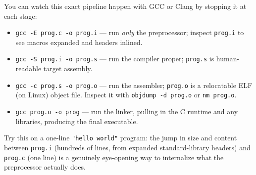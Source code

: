 \documentclass[11pt]{article}
\begin{document}
\begin{enrichment}
You can watch this exact pipeline happen with GCC or Clang by stopping it at each stage:
\begin{itemize}
  \item \texttt{gcc -E prog.c -o prog.i} --- run \emph{only} the preprocessor; inspect
  \texttt{prog.i} to see macros expanded and headers inlined.
  \item \texttt{gcc -S prog.i -o prog.s} --- run the compiler proper; \texttt{prog.s} is
  human-readable target assembly.
  \item \texttt{gcc -c prog.s -o prog.o} --- run the assembler; \texttt{prog.o} is a relocatable
  ELF (on Linux) object file. Inspect it with \texttt{objdump -d prog.o} or \texttt{nm prog.o}.
  \item \texttt{gcc prog.o -o prog} --- run the linker, pulling in the C runtime and any
  libraries, producing the final executable.
\end{itemize}
Try this on a one-line \texttt{"hello world"} program: the jump in size and content between
\texttt{prog.i} (hundreds of lines, from expanded standard-library headers) and \texttt{prog.c}
(one line) is a genuinely eye-opening way to internalize what the preprocessor actually does.
\end{enrichment}
\end{document}
